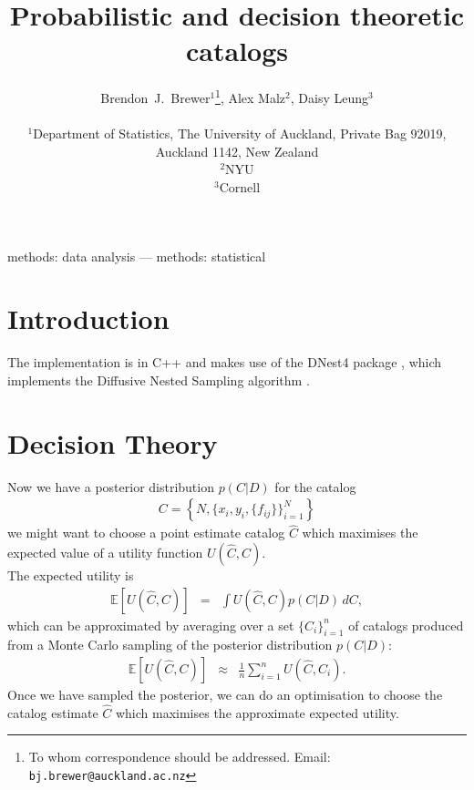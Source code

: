 \documentclass[a4paper,fleqn,usenatbib]{mnras}
\title[]
{Probabilistic and decision theoretic catalogs}
\author[Brewer, Malz, and Leung]{%
  Brendon~J.~Brewer$^{1}$\thanks{To whom correspondence should be addressed. Email: {\tt bj.brewer@auckland.ac.nz}}, Alex Malz$^2$, Daisy Leung$^3$\\
  \medskip\\
  $^1$Department of Statistics, The University of Auckland, Private Bag 92019,
        Auckland 1142, New Zealand\\
  $^2$NYU\\
  $^3$Cornell}
\date{}
\newcommand{\data}{D}
\begin{document}
\label{firstpage}
\pagerange{\pageref{firstpage}--\pageref{lastpage}}
\maketitle

\begin{abstract}
\end{abstract}

\begin{keywords}
methods: data analysis --- methods: statistical
\end{keywords}



\section{Introduction}


The implementation is in C++ and makes use of the DNest4 package \citep{dnest4},
which implements the Diffusive Nested Sampling algorithm \citep{dns}.

\section{Decision Theory}
Now we have a posterior distribution $p(C|\data)$ for the catalog
\begin{eqnarray}
C = \left\{N,\{x_i, y_i, \{f_{ij}\}\}_{i=1}^N \right\}
\end{eqnarray}
we might want to choose a point estimate catalog $\hat{C}$ which
maximises the expected value of a utility function $U(\hat{C}, C)$.\\

The expected utility is
\begin{eqnarray}
\mathds{E}\left[U(\hat{C}, C)\right]
&=&
\int U(\hat{C}, C) p(C | \data) \, dC,
\end{eqnarray}
which can be approximated by averaging over a set $\{C_i\}_{i=1}^n$
of catalogs produced from a Monte Carlo sampling of the posterior distribution
$p(C|\data)$:
\begin{eqnarray}
\mathds{E}\left[U(\hat{C}, C)\right]
&\approx&
\frac{1}{n} \sum_{i=1}^n U(\hat{C}, C_i).
\end{eqnarray}
Once we have sampled the posterior, we can do an optimisation to choose the
catalog estimate $\hat{C}$ which maximises the approximate expected utility.
\end{document}
